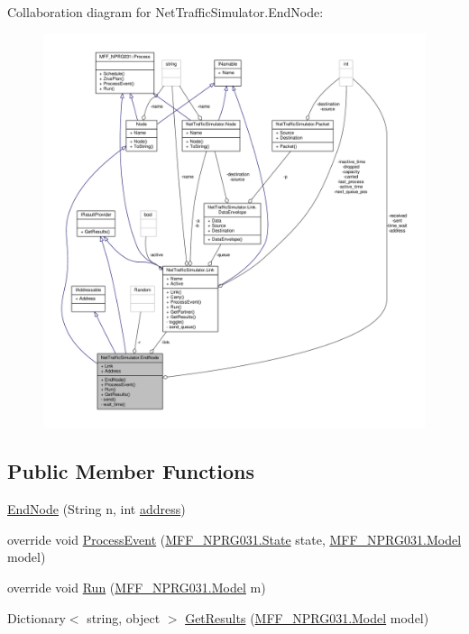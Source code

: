 Collaboration diagram for Net\-Traffic\-Simulator.\-End\-Node\-:
\nopagebreak
\begin{figure}[H]
\begin{center}
\leavevmode
\includegraphics[width=350pt]{classNetTrafficSimulator_1_1EndNode__coll__graph}
\end{center}
\end{figure}
\subsection*{Public Member Functions}
\begin{DoxyCompactItemize}
\item 
\hyperlink{classNetTrafficSimulator_1_1EndNode_ab690976d2c39fafef1f5e5ad0a708ee8}{End\-Node} (String n, int \hyperlink{classNetTrafficSimulator_1_1EndNode_a84d0df6c9c755c895dffff6a531823d2}{address})
\item 
override void \hyperlink{classNetTrafficSimulator_1_1EndNode_a54624ab4b68ccc8c938905ac3e906623}{Process\-Event} (\hyperlink{classMFF__NPRG031_1_1State}{M\-F\-F\-\_\-\-N\-P\-R\-G031.\-State} state, \hyperlink{classMFF__NPRG031_1_1Model}{M\-F\-F\-\_\-\-N\-P\-R\-G031.\-Model} model)
\item 
override void \hyperlink{classNetTrafficSimulator_1_1EndNode_ad672744610489948d0a8126a84a1aab6}{Run} (\hyperlink{classMFF__NPRG031_1_1Model}{M\-F\-F\-\_\-\-N\-P\-R\-G031.\-Model} m)
\item 
Dictionary$<$ string, object $>$ \hyperlink{classNetTrafficSimulator_1_1EndNode_aade90e936fa0903c728fc484be8a57d2}{Get\-Results} (\hyperlink{classMFF__NPRG031_1_1Model}{M\-F\-F\-\_\-\-N\-P\-R\-G031.\-Model} model)
\end{DoxyCompactItemize}
